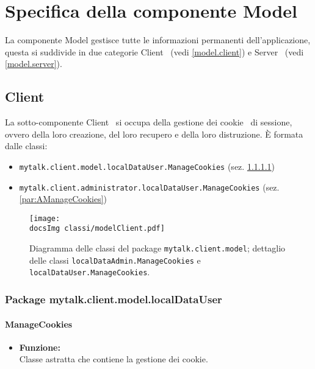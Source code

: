 \section{Specifica della componente Model} {
\begin{sloppypar} {
La componente Model gestisce tutte le informazioni permanenti dell'applicazione, questa si suddivide in due categorie Client\g~ (vedi \ref{model.client}) e Server\g~ (vedi \ref{model.server}).\\

\subsection{Client}{
\label{model.client}
La sotto-componente Client\g~ si occupa della gestione dei cookie\g~ di sessione, ovvero della loro creazione, del loro recupero e della loro distruzione.
\`E formata dalle classi:
\begin{itemize}
	\item[] \texttt{mytalk.client.model.localDataUser.ManageCookies} (sez. \ref{par:CManageCookies})
	\item[] \texttt{mytalk.client.administrator.localDataUser.ManageCookies} (sez. \ref{par:AManageCookies})
\end{itemize}
		\begin{figure}[h!tbp]
		\centering
		\label{fig:modelClient}
		\texttt{[image: \\docsImg classi/modelClient.pdf]}
		\caption{Diagramma delle classi del package \nolinkurl{mytalk.client.model}; dettaglio delle classi \nolinkurl{localDataAdmin.ManageCookies} e \nolinkurl{localDataUser.ManageCookies}.}	
	\end{figure}

	\subsubsection{Package mytalk.client.model.localDataUser}{
		\paragraph{ManageCookies}\label{par:CManageCookies}{
				\begin{itemize}
					\item[] \textbf{Funzione:}{\\
					Classe astratta che contiene la gestione dei cookie\g.\\
					}
				

\end{itemize}}}}}
\end{sloppypar}}
